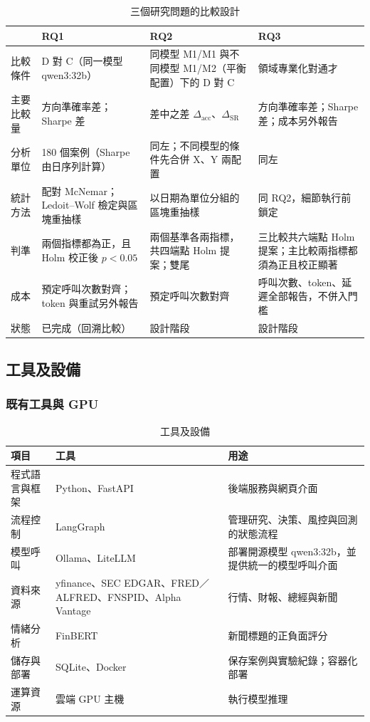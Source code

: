 \begin{table}[H]\centering\small
\caption{三個研究問題的比較設計}
\label{tab:rqcompare}
\begin{tabularx}{\textwidth}{@{}L{.13} Y Y Y@{}}\toprule
 & RQ1 & RQ2 & RQ3 \\\midrule
比較條件 & D 對 C（同一模型 qwen3:32b） & 同模型 M1/M1 與不同模型 M1/M2（平衡配置）下的 D 對 C & 領域專業化對通才 \\
主要比較量 & 方向準確率差；Sharpe 差 & 差中之差 $\Delta_{\mathrm{acc}}$、$\Delta_{\mathrm{SR}}$ & 方向準確率差；Sharpe 差；成本另外報告 \\
分析單位 & 180 個案例（Sharpe 由日序列計算） & 同左；不同模型的條件先合併 X、Y 兩配置 & 同左 \\
統計方法 & 配對 McNemar；Ledoit--Wolf 檢定與區塊重抽樣 & 以日期為單位分組的區塊重抽樣 & 同 RQ2，細節執行前鎖定 \\
判準 & 兩個指標都為正，且 Holm 校正後 $p<0.05$ & 兩個基準各兩指標，共四端點 Holm 提案；雙尾 & 三比較共六端點 Holm 提案；主比較兩指標都須為正且校正顯著 \\
成本 & 預定呼叫次數對齊；token 與重試另外報告 & 預定呼叫次數對齊 & 呼叫次數、token、延遲全部報告，不併入門檻 \\
狀態 & 已完成（回溯比較） & 設計階段 & 設計階段 \\
\bottomrule\end{tabularx}\end{table}

\subsection{工具及設備}

\subsubsection{既有工具與 GPU}
\begin{table}[H]
\centering\small
\caption{工具及設備}
\label{tab:tools}
\begin{tabularx}{\textwidth}{@{}L{.17} Y Y@{}}
\toprule
項目 & 工具 & 用途 \\
\midrule
程式語言與框架 & Python、FastAPI & 後端服務與網頁介面 \\
流程控制 & LangGraph & 管理研究、決策、風控與回測的狀態流程 \\
模型呼叫 & Ollama、LiteLLM & 部署開源模型 qwen3:32b，並提供統一的模型呼叫介面 \\
資料來源 & yfinance、\allowbreak SEC EDGAR、\allowbreak FRED／ALFRED、\allowbreak FNSPID、\allowbreak Alpha Vantage & 行情、財報、總經與新聞 \\
情緒分析 & FinBERT & 新聞標題的正負面評分 \\
儲存與部署 & SQLite、Docker & 保存案例與實驗紀錄；容器化部署 \\
運算資源 & 雲端 GPU 主機 & 執行模型推理 \\
\bottomrule
\end{tabularx}
\end{table}
